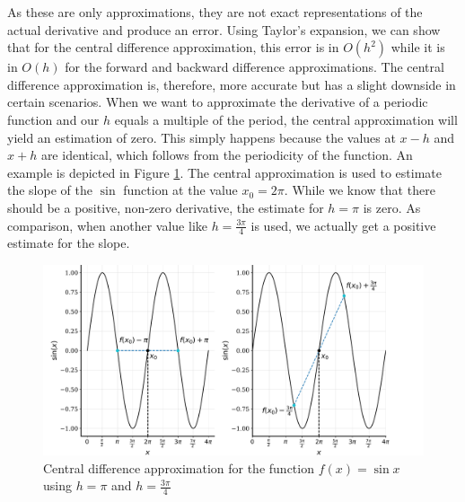 As these are only approximations, they are not exact representations of the actual derivative and produce an error. Using Taylor's expansion, we can show that for the central difference approximation, this error is in $O(h^2)$ while it is in $O(h)$ for the forward and backward difference approximations. The central difference approximation is, therefore, more accurate but has a slight downside in certain scenarios. When we want to approximate the derivative of a periodic function and our $h$ equals a multiple of the period, the central approximation will yield an estimation of zero. This simply happens because the values at $x-h$ and $x + h$ are identical, which follows from the periodicity of the function. An example is depicted in Figure \ref{fig:central_periodic}. The central approximation is used to estimate the slope of the $\sin$ function at the value $x_0 = 2\pi$. While we know that there should be a positive, non-zero derivative, the estimate for $h = \pi$ is zero. As comparison, when another value like $h = \frac{3\pi}{4}$ is used, we actually get a positive estimate for the slope.

\begin{figure}
    \centering
    \includegraphics[width=\textwidth]{figures/central_periodic.pdf}
    \caption{Central difference approximation for the function $f(x) = \sin{x}$ using $h = \pi$ and $h = \frac{3 \pi}{4}$}
    \label{fig:central_periodic}
\end{figure}
